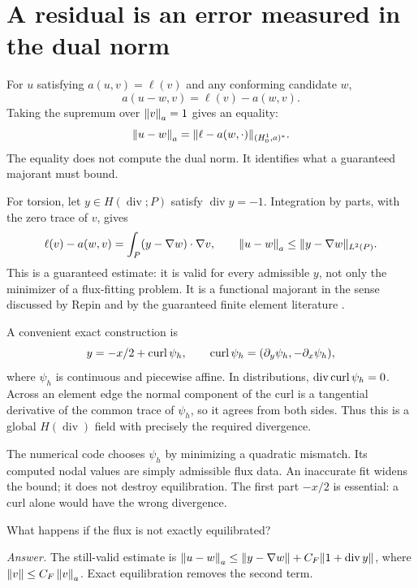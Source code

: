 \section{A residual is an error measured in the dual norm}
\label{l2:residual}
For $u$ satisfying $a(u,v)=\ell(v)$ and any conforming candidate $w$,
\[
 a(u-w,v)=\ell(v)-a(w,v).
\]
Taking the supremum over $\left\|v\right\|_a=1$ gives an equality:
\[
 \left\|u-w\right\|_a=\|\ell-a(w,\cdot)\|_{(H^1_0,a)^*}.
\]
The equality does not compute the dual norm. It identifies what a guaranteed
majorant must bound.

For torsion, let $y\in H(\operatorname{div};P)$ satisfy
$\operatorname{div}y=-1$. Integration by parts, with the zero trace of $v$,
gives
\[
 \ell(v)-a(w,v)=\int_P(y-\nabla w)\cdot\nabla v,
 \qquad \left\|u-w\right\|_a\leq\|y-\nabla w\|_{L^2(P)}.
\]
This is a guaranteed estimate: it is valid for every admissible $y$, not
only the minimizer of a flux-fitting problem. It is a functional majorant
in the sense discussed by Repin and by the guaranteed finite element
literature \cite{Repin2008,LiuOishi2013,LiLiu2018}.

A convenient exact construction is
\begin{equation}
 y=-x/2+\operatorname{curl}\psi_h,
 \qquad \operatorname{curl}\psi_h=(\partial_y\psi_h,-\partial_x\psi_h),
 \label{l2:flux0}
\end{equation}
where $\psi_h$ is continuous and piecewise affine. In distributions,
$\operatorname{div}\operatorname{curl}\psi_h=0$. Across an element edge the normal
component of the curl is a tangential derivative of the common trace of
$\psi_h$, so it agrees from both sides. Thus this is a global
$H(\operatorname{div})$ field with precisely the required divergence.

The numerical code chooses $\psi_h$ by minimizing a quadratic mismatch.
Its computed nodal values are simply admissible flux data. An inaccurate
fit widens the bound; it does not destroy equilibration. The first part
$-x/2$ is essential: a curl alone would have the wrong divergence.

\begin{exercise}
What happens if the flux is not exactly equilibrated?
\end{exercise}
\noindent\emph{Answer.} The still-valid estimate is
$\left\|u-w\right\|_a\leq\|y-\nabla w\|+C_F\|1+\operatorname{div}y\|$,
where $\|v\|\leq C_F\left\|v\right\|_a$. Exact equilibration removes the second term.

